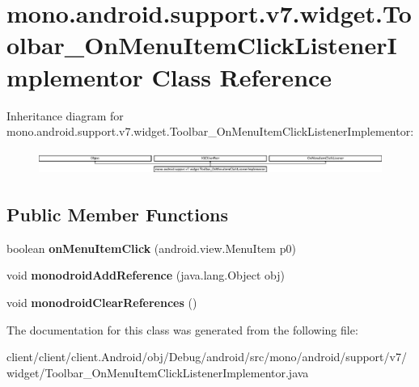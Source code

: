 \hypertarget{classmono_1_1android_1_1support_1_1v7_1_1widget_1_1Toolbar__OnMenuItemClickListenerImplementor}{}\section{mono.\+android.\+support.\+v7.\+widget.\+Toolbar\+\_\+\+On\+Menu\+Item\+Click\+Listener\+Implementor Class Reference}
\label{classmono_1_1android_1_1support_1_1v7_1_1widget_1_1Toolbar__OnMenuItemClickListenerImplementor}
Inheritance diagram for mono.\+android.\+support.\+v7.\+widget.\+Toolbar\+\_\+\+On\+Menu\+Item\+Click\+Listener\+Implementor\+:\begin{figure}[H]
\begin{center}
\leavevmode
\includegraphics[height=0.801144cm]{classmono_1_1android_1_1support_1_1v7_1_1widget_1_1Toolbar__OnMenuItemClickListenerImplementor}
\end{center}
\end{figure}
\subsection*{Public Member Functions}
\begin{DoxyCompactItemize}
\item 
\hypertarget{classmono_1_1android_1_1support_1_1v7_1_1widget_1_1Toolbar__OnMenuItemClickListenerImplementor_abe3c4f78338e12e9652ab414b15582d9}{}boolean {\bfseries on\+Menu\+Item\+Click} (android.\+view.\+Menu\+Item p0)\label{classmono_1_1android_1_1support_1_1v7_1_1widget_1_1Toolbar__OnMenuItemClickListenerImplementor_abe3c4f78338e12e9652ab414b15582d9}

\item 
\hypertarget{classmono_1_1android_1_1support_1_1v7_1_1widget_1_1Toolbar__OnMenuItemClickListenerImplementor_a6c66afd38fc5d57a713c37f2059db0f0}{}void {\bfseries monodroid\+Add\+Reference} (java.\+lang.\+Object obj)\label{classmono_1_1android_1_1support_1_1v7_1_1widget_1_1Toolbar__OnMenuItemClickListenerImplementor_a6c66afd38fc5d57a713c37f2059db0f0}

\item 
\hypertarget{classmono_1_1android_1_1support_1_1v7_1_1widget_1_1Toolbar__OnMenuItemClickListenerImplementor_a9e539eca7d6aaa4b43bd92a24f3ffe84}{}void {\bfseries monodroid\+Clear\+References} ()\label{classmono_1_1android_1_1support_1_1v7_1_1widget_1_1Toolbar__OnMenuItemClickListenerImplementor_a9e539eca7d6aaa4b43bd92a24f3ffe84}

\end{DoxyCompactItemize}


The documentation for this class was generated from the following file\+:\begin{DoxyCompactItemize}
\item 
client/client/client.\+Android/obj/\+Debug/android/src/mono/android/support/v7/widget/Toolbar\+\_\+\+On\+Menu\+Item\+Click\+Listener\+Implementor.\+java\end{DoxyCompactItemize}

